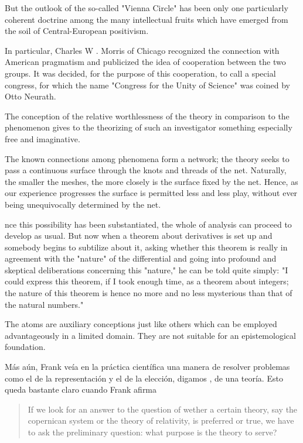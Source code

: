 But the outlook of the so-called "Vienna Circle"  has been only one particularly coherent doctrine  among the many intellectual fruits which have  emerged from the soil of Central-European positivism.

In particular, Charles  W . Morris of Chicago recognized the connection  with American pragmatism and publicized the idea  of cooperation between the two groups. It was decided, for the purpose of this cooperation, to call a  special congress, for which the name "Congress for  the Unity of Science" was coined by Otto Neurath.

The conception of the relative worthlessness of the theory in  comparison to the phenomenon gives to the theorizing  of such an investigator something especially free and  imaginative.

The known connections among  phenomena form a network; the theory seeks to pass  a continuous surface through the knots and threads  of the net. Naturally, the smaller the meshes, the  more closely is the surface fixed by the net. Hence,  as our experience progresses the surface is permitted  less and less play, without ever being unequivocally  determined by the net.

nce this possibility has been substantiated,  the whole of analysis can proceed to develop as usual.  But now when a theorem about derivatives is set up  and somebody begins to subtilize about it, asking  whether this theorem is really in agreement with the  "nature" of the differential and going into profound  and skeptical deliberations concerning this "nature,"  he can be told quite simply: "I could express this  theorem, if I took enough time, as a theorem about  integers; the nature of this theorem is hence no more  and no less mysterious than that of the natural  numbers."

The  atoms are auxiliary conceptions just like others which  can be employed advantageously in a limited domain.  They are not suitable for an epistemological foundation.

Más aún, Frank veía en la práctica científica una manera de resolver problemas como el de la representación y el de la elección, digamos , de una teoría.
Esto queda bastante claro cuando Frank afirma

\begin{quote}
	If we look for an answer to the question of wether a certain theory, say the copernican system or the theory of relativity, is preferred or true, we have to ask the preliminary question: what purpose is the theory to serve? \parencite[p. 15]{Frank1954}
\end{quote}

